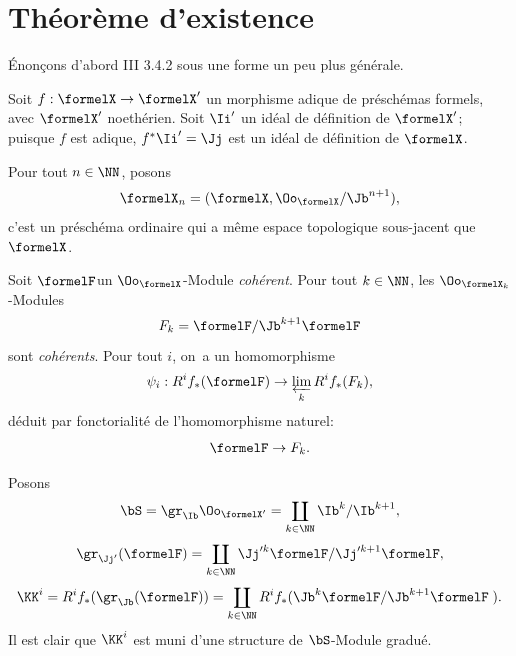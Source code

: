 \section{Th\'eor\`eme d'existence}

\'Enon\c cons d'abord \EGA III 3.4.2 sous une forme un peu plus
g\'en\'erale.

Soit $f:\formelX \to \formelX'$ un morphisme adique de pr\'esch\'emas formels, avec $\formelX'$ noeth\'erien. Soit $\Ii'$ un id\'eal de d\'efinition de $\formelX'$; puisque $f$ est adique, $f^*\Ii'=\Jj$ est un id\'eal de d\'efinition de $\formelX$.

Pour tout $n\in \NN$, posons \label{IX.2}
\begin{equation} \label{eq:IX.2.1}
\formelX_n=(\formelX, \Oo_\formelX/{\Jb}^{n+1}),
\end{equation}
c'est un pr\'esch\'ema ordinaire qui a m\^eme espace topologique sous-jacent que $\formelX$.

Soit $\formelF$\pageoriginale un $\Oo_\formelX$-Module \emph{coh\'erent}. Pour tout $k\in\NN$, les $\Oo_{\formelX_k}$-Modules
\begin{equation} \label{eq:IX.2.2}
F_k=\formelF/{\Jb}^{k+1}\formelF
\end{equation}
sont \emph{coh\'erents}. Pour tout $i$, on~a un homomorphisme
\begin{equation} \label{eq:IX.2.3} \psi_i: R^if_*(\formelF) \to \varprojlim_k R^if_*(F_k),
\end{equation}
d\'eduit par fonctorialit\'e de l'homomorphisme naturel:
\begin{equation} \label{eq:IX.2.4} \formelF \to F_k.
\end{equation}

Posons
\begin{equation} \label{eq:IX.2.5}
\bS= \gr_{{\Ib}}\Oo_{\formelX'}=\coprod_{k \in \NN} {\Ib}^k/{\Ib}^{k+1},
\end{equation}
\begin{equation} \label{eq:IX.2.6} \gr_{\Jj'}(\formelF)=\coprod_{k \in \NN} \Jj'^k\formelF/\Jj'^{k+1}\formelF,
\end{equation}
\begin{equation} \label{eq:IX.2.7} \KK^i=R^if_*(\gr_{{\Jb}}(\formelF))=\coprod_{k \in \NN}R^if_* ({\Jb}^k \formelF/{\Jb}^{k+1}\formelF\;).
\end{equation}
Il est clair que $\KK^i$ est muni d'une structure de $\bS$-Module gradu\'e.

